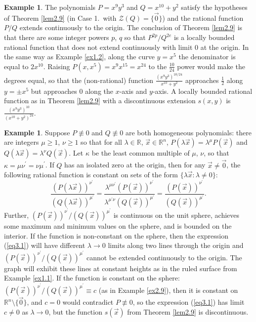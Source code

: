 \documentclass[12pt]{amsart}
\theoremstyle{definition}
\newtheorem{example}[thm]{Example}
\theoremstyle{remark}
\numberwithin{equation}{section}
\newcommand{\re}{\mathbb{R}}
\newcommand{\vv}{\mathcal{Z}}
\begin{document}
\begin{example}\label{ex3.5}
  The polynomials $P=x^{9}y^3$ and $Q=x^{10}+y^2$ satisfy the hypotheses of Theorem \ref{lem2.9} (in Case 1.\ with $\vv(Q)=\{\vec0\}$) and the rational function $P/Q$ extends continuously to the origin.  The conclusion of Theorem \ref{lem2.9} is that there are some integer powers $p$, $q$ so that  $P^{2p}/Q^{2e}$ is a locally bounded rational function that does not extend continuously with limit $0$ at the origin.  In the same way as Example \ref{ex1.2}, along the curve $y=x^5$ the denominator is equal to $2x^{10}$.  Raising $P(x,x^5)=x^{9}x^{15}=x^{24}$ to the $\frac{10}{24}$ power would make the degrees equal, so that the (non-rational) function $\displaystyle{\frac{(x^{9}y^3)^{10/24}}{x^{10}+y^2}}$ approaches $\frac12$ along $y=\pm x^5$ but approaches $0$ along the $x$-axis and $y$-axis.  A locally bounded rational function as in Theorem \ref{lem2.9} with a discontinuous extension $s(x,y)$ is $\displaystyle{\frac{(x^{9}y^3)^{10}}{(x^{10}+y^2)^{24}}}$.
\end{example}
\begin{example}\label{ex3.4}
  Suppose $P\not\equiv0$ and $Q\not\equiv0$ are both homogeneous polynomials: there are integers $\mu\ge1$, $\nu\ge1$ so that for all $\lambda\in\re$, $\vec x\in\re^n$, $P(\lambda\vec x)=\lambda^\mu P(\vec x)$ and $Q(\lambda\vec x)=\lambda^\nu Q(\vec x)$.  Let $\kappa$ be the least common multiple of $\mu$, $\nu$, so that $\kappa=\mu \nu^\prime=\nu\mu^\prime$.  If $Q$ has an isolated zero at the origin, then for any $\vec x\ne\vec0$, the following rational function is constant on sets of the form $\{\lambda\vec x:\lambda\ne0\}$:
  \begin{equation}\label{eq3.1}
    \frac{(P(\lambda\vec x))^{\nu^\prime}}{(Q(\lambda\vec x))^{\mu^\prime}}=\frac{\lambda^{\mu\nu^\prime}(P(\vec x))^{\nu^\prime}}{\lambda^{\mu^\prime\nu}(Q(\vec x))^{\mu^\prime}}=\frac{(P(\vec x))^{\nu^\prime}}{(Q(\vec x))^{\mu^\prime}}.
  \end{equation}
  Further, ${(P(\vec x))^{\nu^\prime}}/{(Q(\vec x))^{\mu^\prime}}$ is continuous on the unit sphere, achieves some maximum and minimum values on the sphere, and is bounded on the interior.  If the function is non-constant on the sphere, then the expression (\ref{eq3.1}) will have different $\lambda\to0$ limits along two lines through the origin and ${(P(\vec x))^{\nu^\prime}}/{(Q(\vec x))^{\mu^\prime}}$ cannot be extended continuously to the origin.  The graph will exhibit these lines at constant heights as in the ruled surface from Example \ref{ex1.1}.  If the function is constant on the sphere: $(P(\vec x))^{\nu^\prime}/(Q(\vec x))^{\mu^\prime}\equiv c$ (as in Example \ref{ex2.9}), then it is constant on $\re^n\setminus\{\vec0\}$, and $c=0$ would contradict $P\not\equiv0$, so the expression (\ref{eq3.1}) has limit $c\ne0$ as $\lambda\to0$, but the function $s(\vec x)$ from Theorem \ref{lem2.9} is discontinuous.  
\end{example}
\end{document}
